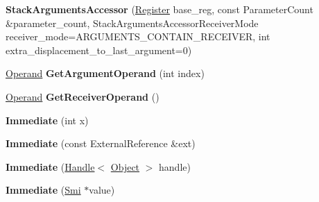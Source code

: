 \begin{DoxyCompactItemize}
\item 
{\bfseries Stack\+Arguments\+Accessor} (\hyperlink{structv8_1_1internal_1_1_register}{Register} base\+\_\+reg, const Parameter\+Count \&parameter\+\_\+count, Stack\+Arguments\+Accessor\+Receiver\+Mode receiver\+\_\+mode=A\+R\+G\+U\+M\+E\+N\+T\+S\+\_\+\+C\+O\+N\+T\+A\+I\+N\+\_\+\+R\+E\+C\+E\+I\+V\+ER, int extra\+\_\+displacement\+\_\+to\+\_\+last\+\_\+argument=0)\hypertarget{classv8_1_1internal_1_1_b_a_s_e___e_m_b_e_d_d_e_d_ae580967ecc734b90ac61c0daade7b3d7}{}\label{classv8_1_1internal_1_1_b_a_s_e___e_m_b_e_d_d_e_d_ae580967ecc734b90ac61c0daade7b3d7}

\item 
\hyperlink{classv8_1_1internal_1_1_operand}{Operand} {\bfseries Get\+Argument\+Operand} (int index)\hypertarget{classv8_1_1internal_1_1_b_a_s_e___e_m_b_e_d_d_e_d_a8fbc730dfb3c707a4930c9d54f1c24f4}{}\label{classv8_1_1internal_1_1_b_a_s_e___e_m_b_e_d_d_e_d_a8fbc730dfb3c707a4930c9d54f1c24f4}

\item 
\hyperlink{classv8_1_1internal_1_1_operand}{Operand} {\bfseries Get\+Receiver\+Operand} ()\hypertarget{classv8_1_1internal_1_1_b_a_s_e___e_m_b_e_d_d_e_d_adfc0326b77705a5d9983df517bb6a097}{}\label{classv8_1_1internal_1_1_b_a_s_e___e_m_b_e_d_d_e_d_adfc0326b77705a5d9983df517bb6a097}

\item 
{\bfseries Immediate} (int x)\hypertarget{classv8_1_1internal_1_1_b_a_s_e___e_m_b_e_d_d_e_d_ac321ecc2e581bbd8ac846875dbe80b72}{}\label{classv8_1_1internal_1_1_b_a_s_e___e_m_b_e_d_d_e_d_ac321ecc2e581bbd8ac846875dbe80b72}

\item 
{\bfseries Immediate} (const External\+Reference \&ext)\hypertarget{classv8_1_1internal_1_1_b_a_s_e___e_m_b_e_d_d_e_d_a026871a142272f98b0cdbbd97fcb8c5b}{}\label{classv8_1_1internal_1_1_b_a_s_e___e_m_b_e_d_d_e_d_a026871a142272f98b0cdbbd97fcb8c5b}

\item 
{\bfseries Immediate} (\hyperlink{classv8_1_1internal_1_1_handle}{Handle}$<$ \hyperlink{classv8_1_1internal_1_1_object}{Object} $>$ handle)\hypertarget{classv8_1_1internal_1_1_b_a_s_e___e_m_b_e_d_d_e_d_ac276eb97453d3a79cca32332ac45bae3}{}\label{classv8_1_1internal_1_1_b_a_s_e___e_m_b_e_d_d_e_d_ac276eb97453d3a79cca32332ac45bae3}

\item 
{\bfseries Immediate} (\hyperlink{classv8_1_1internal_1_1_smi}{Smi} $\ast$value)\hypertarget{classv8_1_1internal_1_1_b_a_s_e___e_m_b_e_d_d_e_d_ac45839de8f3d7433ee961762cababc89}{}\label{classv8_1_1internal_1_1_b_a_s_e___e_m_b_e_d_d_e_d_ac45839de8f3d7433ee961762cababc89}


\end{DoxyCompactItemize}
